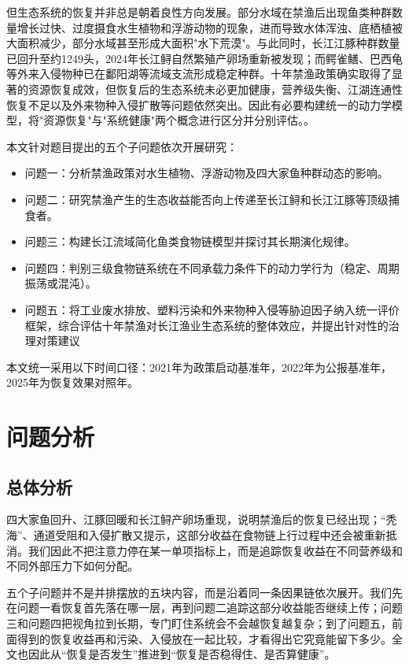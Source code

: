 \documentclass{MMCStyle}
\begin{document}
但生态系统的恢复并非总是朝着良性方向发展。部分水域在禁渔后出现鱼类种群数量增长过快、过度摄食水生植物和浮游动物的现象，进而导致水体浑浊、底栖植被大面积减少，部分水域甚至形成大面积"水下荒漠"。与此同时，长江江豚种群数量已回升至约1249头，2024年长江鲟自然繁殖产卵场重新被发现；而鳄雀鳝、巴西龟等外来入侵物种已在鄱阳湖等流域支流形成稳定种群。十年禁渔政策确实取得了显著的资源恢复成效，但恢复后的生态系统未必更加健康，营养级失衡、江湖连通性恢复不足以及外来物种入侵扩散等问题依然突出。因此有必要构建统一的动力学模型，将"资源恢复"与"系统健康"两个概念进行区分并分别评估。\cite{report2022,report2023}。

本文针对题目提出的五个子问题依次开展研究：
\begin{itemize}
\item 问题一：分析禁渔政策对水生植物、浮游动物及四大家鱼种群动态的影响。
\item 问题二：研究禁渔产生的生态收益能否向上传递至长江鲟和长江江豚等顶级捕食者。
\item 问题三：构建长江流域简化鱼类食物链模型并探讨其长期演化规律。
\item 问题四：判别三级食物链系统在不同承载力条件下的动力学行为（稳定、周期振荡或混沌）。
\item 问题五：将工业废水排放、塑料污染和外来物种入侵等胁迫因子纳入统一评价框架，综合评估十年禁渔对长江渔业生态系统的整体效应，并提出针对性的治理对策建议
\end{itemize}
本文统一采用以下时间口径：2021年为政策启动基准年，2022年为公报基准年，2025年为恢复效果对照年\cite{yangtzeA}。

\section{问题分析}
\subsection{总体分析}
四大家鱼回升、江豚回暖和长江鲟产卵场重现，说明禁渔后的恢复已经出现；“秃海”、通道受阻和入侵扩散又提示，这部分收益在食物链上行过程中还会被重新抵消。我们因此不把注意力停在某一单项指标上，而是追踪恢复收益在不同营养级和不同外部压力下如何分配。

五个子问题并不是并排摆放的五块内容，而是沿着同一条因果链依次展开。我们先在问题一看恢复首先落在哪一层，再到问题二追踪这部分收益能否继续上传；问题三和问题四把视角拉到长期，专门盯住系统会不会越恢复越复杂；到了问题五，前面得到的恢复收益再和污染、入侵放在一起比较，才看得出它究竟能留下多少。全文也因此从“恢复是否发生”推进到“恢复是否稳得住、是否算健康”。
\end{document}
